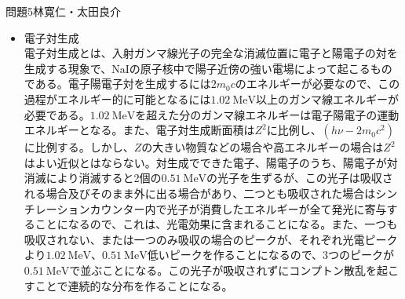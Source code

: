 \documentclass[fleqn]{jbook}
\begin{document}
\begin{answer}{問題5}{林寛仁・太田良介}
\begin{enumerate}
\begin{itemize}
\begin{figure}[h]
\begin{center}
  		\end{center}
	\end{figure}
光子のエネルギーが電子の結合エネルギーに比較して十分大きくなって電子を自由電子と見なすことが出来るなると、非弾性散乱を受ける。図の様に、散乱前は電子が静止していたと仮定して、散乱前の光子のエネルギーを$h\nu$、散乱光子のエネルギーを$h\nu^\prime$、電子の静止質量エネルギーを$m_0c^2$、散乱角を$\theta$とすると、エネルギーの関係は
	\begin{eqnarray}
		h\nu^\prime&=&\frac{h\nu}{1+\frac{h\nu}{m_0c^2}(1-\cos\theta)}\nonumber
	\end{eqnarray}
で表される。これより、コンプトン散乱によって得られる電子の運動エネルギー$E$は、
	\begin{equation}
		0 \le E \le \frac{2\frac{h\nu}{m_0 c^2}}{1+2\frac{h\nu}{m_0c^2}} 
		\cdot h\nu 										\nonumber
	\end{equation}
となり、連続的なエネルギー分布を取ることが分かる。これより、入射光子のエネルギーが非常に大きくなると、電子が得られる運動エネルギーは$E=h\nu - \frac{m_0 c^2}{2}\simeq h\nu - 0.26\ [\mathrm{MeV}]$に近づくことが分かる。また、コンプトン散乱断面積はシンチレーションカウンターの$Z$に比例する。しかし光電効果は1回だけ起こるものではなく複数回起こり得るので、このため、全エネルギーをシンチレーションカウンター内で電子に与えることになると、光電効果とほぼ同じエネルギーを与えることになるので、これにより光電効果と同等のイベントにもなりうる。また、これより、シンチレーションカウンターが大型になれば、コンプトン散乱が複数回行われる確率があがるため、光子の全エネルギーに相当する光電効果によるイベント数が見かけ上増えることになる。大型のシンチレーションカウンターでは光電効果よりもコンプトン散乱による全エネルギーに相当するイベントの割合が大きく、光電効果の断面積を用いて光電ピーク効率を計算することはできない。
	\item 電子対生成\\
	電子対生成とは、入射ガンマ線光子の完全な消滅位置に電子と陽電子の対を生成する現象で、$\mathrm{NaI}$の原子核中で陽子近傍の強い電場によって起こるものである。電子陽電子対を生成するには$2m_0c$のエネルギーが必要なので、この過程がエネルギー的に可能となるには$1.02 \ \mathrm{MeV}$以上のガンマ線エネルギーが必要である。$1.02 \ \mathrm{MeV}$を超えた分のガンマ線エネルギーは電子陽電子の運動エネルギーとなる。また、電子対生成断面積は$Z^2$に比例し、$\left(h\nu - 2m_0 c^2 \right)$に比例する。しかし、$Z$の大きい物質などの場合や高エネルギーの場合は$Z^2$はよい近似とはならない。対生成でできた電子、陽電子のうち、陽電子が対消滅により消滅すると2個の$0.51 \ \mathrm{MeV}$の光子を生ずるが、この光子は吸収される場合及びそのまま外に出る場合があり、二つとも吸収された場合はシンチレーションカウンター内で光子が消費したエネルギーが全て発光に寄与することになるので、これは、光電効果に含まれることになる。また、一つも吸収されない、または一つのみ吸収の場合のピークが、それぞれ光電ピークより$1.02 \ \mathrm{MeV}$、$0.51 \ \mathrm{MeV}$低いピークを作ることになるので、3つのピークが$0.51 \ \mathrm{MeV}$で並ぶことになる。この光子が吸収されずにコンプトン散乱を起こすことで連続的な分布を作ることになる。

\end{itemize}
\end{enumerate}
\end{answer}
\end{document}
